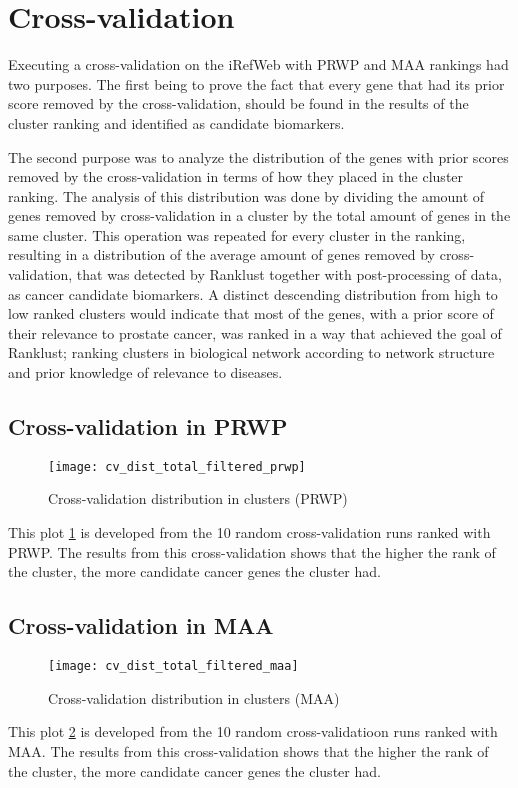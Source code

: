 \section{Cross-validation}
Executing a cross-validation on the iRefWeb with PRWP and MAA rankings had two
purposes. The first being to prove the fact that every gene that had its prior
score removed by the cross-validation, should be found in the results of the
cluster ranking and identified as candidate biomarkers. 

The second purpose was to analyze the distribution of the genes with prior
scores removed by the cross-validation in terms of how they placed in the
cluster ranking. The analysis of this distribution was done by dividing the
amount of genes removed by cross-validation in a cluster by the total amount of
genes in the same cluster. This operation was repeated for every cluster in the
ranking, resulting in a distribution of the average amount of genes removed by
cross-validation, that was detected by Ranklust together with post-processing of
data, as cancer candidate biomarkers. A distinct descending distribution from
high to low ranked clusters would indicate that most of the genes, with a prior
score of their relevance to prostate cancer, was ranked in a way that achieved
the goal of Ranklust; ranking clusters in biological network according to
network structure and prior knowledge of relevance to diseases.

\subsection{Cross-validation in PRWP}
\hspace*{-2cm}\begin{figure}[H]
    \label{fig:irefweb-prwp}
    \texttt{[image: cv\_dist\_total\_filtered\_prwp]}
    \caption{Cross-validation distribution in clusters (PRWP)}
\end{figure}
This plot \ref{fig:irefweb-prwp} is developed from the 10 random
cross-validation runs ranked with PRWP. The results from this cross-validation
shows that the higher the rank of the cluster, the more candidate cancer genes
the cluster had.

\subsection{Cross-validation in MAA}
\hspace*{-2cm}\begin{figure}[H]
    \label{fig:irefweb-maa}
    \texttt{[image: cv\_dist\_total\_filtered\_maa]}
    \caption{Cross-validation distribution in clusters (MAA)}
\end{figure}
This plot \ref{fig:irefweb-maa} is developed from the 10 random
cross-validatioon runs ranked with MAA. The results from this cross-validation
shows that the higher the rank of the cluster, the more candidate cancer genes
the cluster had.

